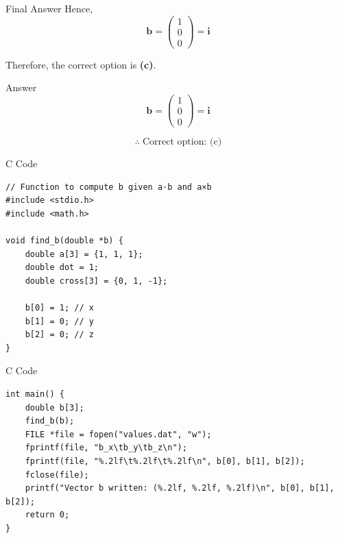 \documentclass{beamer}
\newcommand{\myvec}[1]{\begin{pmatrix}#1\end{pmatrix}}
\renewcommand{\vec}[1]{\mathbf{#1}}
\begin{document}
\begin{frame}{Final Answer}
Hence,
\[
\vec{b}=\myvec{1\\0\\0}=\vec{i}
\]

Therefore, the correct option is \textbf{(c)}.
\end{frame}


\begin{frame}{Answer}
\[
\vec{b} = \myvec{1\\0\\0} = \vec{i}
\]

\[
\therefore \; \text{Correct option: (c)}
\]
\end{frame}

\begin{frame}[fragile]{C Code}
\lstset{language=C}
\begin{lstlisting}
// Function to compute b given a·b and a×b
#include <stdio.h>
#include <math.h>

void find_b(double *b) {
    double a[3] = {1, 1, 1};
    double dot = 1;
    double cross[3] = {0, 1, -1};

    b[0] = 1; // x
    b[1] = 0; // y
    b[2] = 0; // z
}
\end{lstlisting}
\end{frame}

\begin{frame}[fragile]{C Code}
\lstset{language=C}
\begin{lstlisting}
int main() {
    double b[3];
    find_b(b);
    FILE *file = fopen("values.dat", "w");
    fprintf(file, "b_x\tb_y\tb_z\n");
    fprintf(file, "%.2lf\t%.2lf\t%.2lf\n", b[0], b[1], b[2]);
    fclose(file);
    printf("Vector b written: (%.2lf, %.2lf, %.2lf)\n", b[0], b[1], b[2]);
    return 0;
}
\end{lstlisting}
\end{frame}
\end{document}

